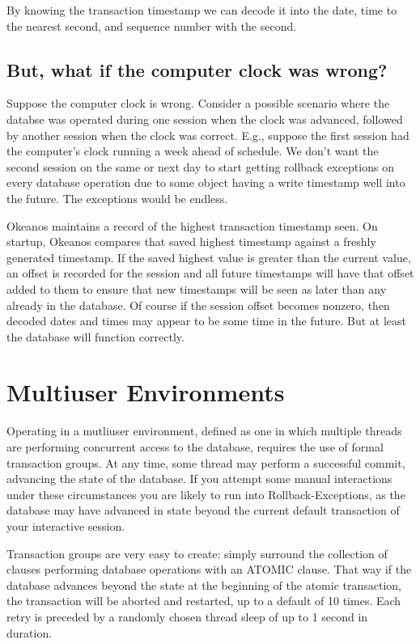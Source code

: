 \documentclass[article,oneside]{memoir}
\begin{document}
By knowing the transaction timestamp we can decode it into the date, time to the nearest second, and sequence number with the second.

\subsection{But, what if the computer clock was wrong?}
Suppose the computer clock is wrong. Consider a possible scenario where the databse was operated during one session when the clock was advanced, followed by another session when the clock was correct. E.g., suppose the first session had the computer's clock running a week ahead of schedule. We don't want the second session on the same or next day to start getting rollback exceptions on every database operation due to some object having a write timestamp well into the future. The exceptions would be endless.

Okeanos maintains a record of the highest transaction timestamp seen. On startup, Okeanos compares that saved highest timestamp against a freshly generated timestamp. If the saved highest value is greater than the current value, an offset is recorded for the session and all future timestamps will have that offset added to them to ensure that new timestamps will be seen as later than any already in the database. Of course if the session offset becomes nonzero, then decoded dates and times may appear to be some time in the future. But at least the database will function correctly.

\section{Multiuser Environments}
Operating in a mutliuser environment, defined as one in which multiple threads are performing concurrent access to the database, requires the use of formal transaction groups. At any time, some thread may perform a successful commit, advancing the state of the database. If you attempt some manual interactions under these circumstances you are likely to run into Rollback-Exceptions, as the database may have advanced in state beyond the current default transaction of your interactive session.

Transaction groups are very easy to create: simply surround the collection of clauses performing database operations with an {\ttfamily ATOMIC} clause. That way if the database advances beyond the state at the beginning of the atomic transaction, the transaction will be aborted and restarted, up to a default of 10 times. Each retry is preceded by a randomly chosen thread sleep of up to 1 second in duration.
\end{document}
